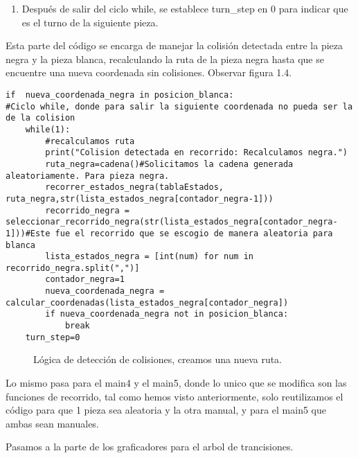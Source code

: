 \begin{enumerate}
\begin{enumerate}
\begin{enumerate}
        \end{enumerate}
    \item Después de salir del ciclo while, se establece turn\_step en 0 para indicar que es el turno de la siguiente pieza.\newline
\end{enumerate}

Esta parte del código se encarga de manejar la colisión detectada entre la pieza negra y la pieza blanca, recalculando la ruta de la pieza negra hasta que se encuentre una nueva coordenada sin colisiones. Observar figura 1.4.\newline

\begin{lstlisting}
if  nueva_coordenada_negra in posicion_blanca:
#Ciclo while, donde para salir la siguiente coordenada no pueda ser la de la colision
    while(1):
        #recalculamos ruta
        print("Colision detectada en recorrido: Recalculamos negra.")
        ruta_negra=cadena()#Solicitamos la cadena generada aleatoriamente. Para pieza negra.
        recorrer_estados_negra(tablaEstados, ruta_negra,str(lista_estados_negra[contador_negra-1]))
        recorrido_negra = seleccionar_recorrido_negra(str(lista_estados_negra[contador_negra-1]))#Este fue el recorrido que se escogio de manera aleatoria para blanca
        lista_estados_negra = [int(num) for num in recorrido_negra.split(",")]
        contador_negra=1
        nueva_coordenada_negra = calcular_coordenadas(lista_estados_negra[contador_negra])
        if nueva_coordenada_negra not in posicion_blanca:
            break
    turn_step=0
\end{lstlisting}
\begin{figure}[h]
\caption{Lógica de detección de colisiones, creamos una nueva ruta.}
\label{fig:imagen}
\end{figure}


Lo mismo pasa para el main4 y el main5, donde lo unico que se modifica son las funciones de recorrido, tal como hemos visto anteriormente, solo reutilizamos el código para que 1 pieza sea aleatoria y la otra manual, y para el main5 que ambas sean manuales.\newline

Pasamos a la parte de los graficadores para el arbol de trancisiones.\newline


\end{enumerate}
